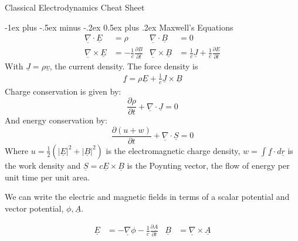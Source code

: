 \documentclass[10pt,landscape]{article}
\makeatletter
\renewcommand{\section}{\@startsection{section}{1}{0mm}%
                                {-1ex plus -.5ex minus -.2ex}%
                                {0.5ex plus .2ex}%
                                {\normalfont\large\bfseries}}
\makeatother
\begin{document}
\raggedright
\footnotesize
\begin{multicols}{3}


\setlength{\premulticols}{1pt}
\setlength{\postmulticols}{1pt}
\setlength{\multicolsep}{1pt}
\setlength{\columnsep}{2pt}

\begin{center}
     \Large{Classical Electrodynamics Cheat Sheet} \\
\end{center}
\section{Maxwell's Equations}
\begin{align*}
	\underline \nabla \cdot \underline E &= \rho & \underline \nabla \cdot \underline B &= 0 \\
	\underline \nabla \times \underline E &= -\frac{1}{c}\frac{\partial \underline B}{\partial t} &
	\underline \nabla \times \underline B &= \frac{1}{c} \underline J + \frac{1}{c}\frac{\partial \underline E}{\partial t}
\end{align*}
With $\underline J=\rho \underline v$, the current density.
The force density is 
\begin{align*}
	\underline f = \rho \underline E + \frac{1}{c}\underline J \times \underline B
\end{align*}
Charge conservation is given by:
\begin{equation*}
	\frac{\partial \rho}{\partial t} + \underline \nabla \cdot \underline J = 0
\end{equation*}
And energy conservation by:
\begin{equation*}
	\frac{\partial (u+w)}{\partial t} + \underline \nabla \cdot \underline S = 0
\end{equation*}
Where $u=\frac{1}{2}(|\underline E|^2 + |\underline B|^2)$ is the electromagnetic charge density, $w=\int \underline f \cdot d\underline r$ is the work density and $\underline S=c\underline E\times\underline B$ is the Poynting vector, the flow of energy per unit time per unit area.

We can write the electric and magnetic fields in terms of a scalar potential and vector potential, $\phi, \underline A$.

\begin{align}
	\underline E &= -\underline\nabla\phi - \frac{1}{c}\frac{\partial \underline A}{\partial t} & \underline B &= \underline \nabla \times \underline A
\end{align}


\end{multicols}
\end{document}
